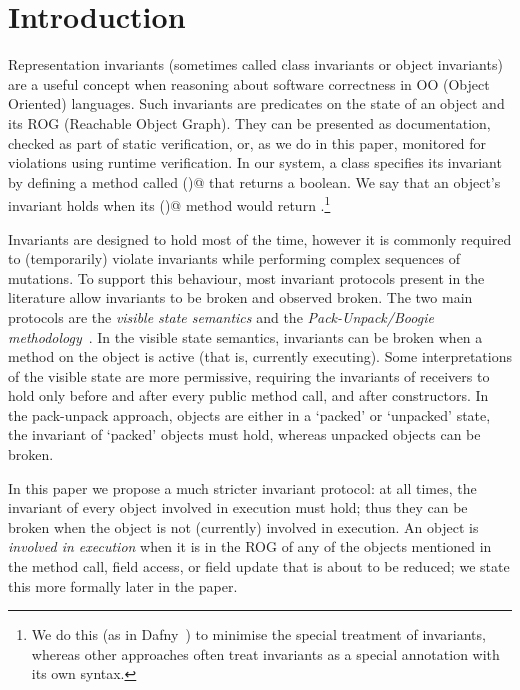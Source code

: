 \section{Introduction}
\label{s:intro}
Representation invariants (sometimes called class invariants or object invariants) are
a useful concept when reasoning about software correctness in OO (Object Oriented) languages. Such invariants are predicates on the state of an object and its ROG (Reachable Object Graph).
They can be presented as documentation, checked as part of static verification, or, as we do in this paper, monitored for violations using runtime verification.
In our system, a class specifies its invariant by defining a method called \Q@invariant()@
that returns a boolean.
We say that an object's invariant holds when its \Q@invariant()@ method would return \Q@true@.\footnote{We do this (as in Dafny~\cite{DBLP:conf/sigada/Leino12}) to minimise the special treatment of invariants, whereas other approaches often treat invariants as a special annotation with its own syntax.}

Invariants are designed to hold most of the time, however it is commonly required to (temporarily) violate invariants while performing complex sequences of mutations.
To support this behaviour, most invariant protocols present in the literature allow invariants to be broken and observed broken.
The two main protocols are the \emph{visible state semantics} \cite{Meyer:1988:OSC:534929} and the \emph{Pack-Unpack/Boogie methodology}~\cite{DBLP:journals/jot/BarnettDFLS04}.
In the visible state semantics, invariants can be broken when a method on the object is active (that is, currently executing).
Some interpretations of the visible state are more permissive, requiring the invariants of receivers to hold only before and after every public method call, and after constructors. 
In the pack-unpack approach, objects are either in a `packed' or `unpacked' state, 
the invariant of `packed' objects must hold, whereas unpacked objects can be broken.

In this paper we propose a much stricter invariant protocol: at all times, the invariant of every object involved in execution must hold; thus they can be broken when the object is not (currently) involved in execution. 
An object is \emph{involved in execution} when it is in the ROG of any of the objects mentioned in the method call, field access, or field update that is about to be reduced; we state this more formally later in the paper.

